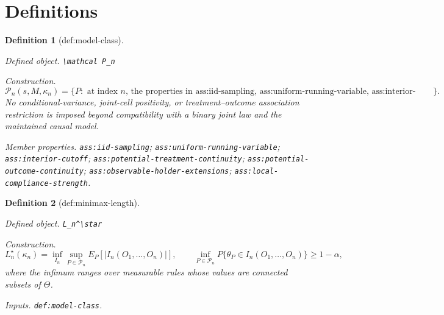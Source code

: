 \documentclass{article}
\newtheorem{definition}{Definition}
\begin{document}
\section{Definitions}

\begin{definition}[def:model-class]\label{def:model-class}
\par\smallskip\noindent\emph{Defined object.} \texttt{\textbackslash{}\allowbreak{}mathcal P\_\allowbreak{}n}
\par\smallskip\noindent\emph{Construction.} \[\mathcal P_n(s,M,\kappa_n)=\{P:\text{ at index }n\text{, the properties in ass:iid-sampling, ass:uniform-running-variable, ass:interior-cutoff, ass:potential-treatment-continuity, ass:potential-outcome-continuity, ass:observable-holder-extensions, and ass:local-compliance-strength hold}\}.\] No conditional-variance, joint-cell positivity, or treatment--outcome association restriction is imposed beyond compatibility with a binary joint law and the maintained causal model.
\par\smallskip\noindent\emph{Member properties.} \texttt{ass:\allowbreak{}iid-\allowbreak{}sampling}; \texttt{ass:\allowbreak{}uniform-\allowbreak{}running-\allowbreak{}variable}; \texttt{ass:\allowbreak{}interior-\allowbreak{}cutoff}; \texttt{ass:\allowbreak{}potential-\allowbreak{}treatment-\allowbreak{}continuity}; \texttt{ass:\allowbreak{}potential-\allowbreak{}outcome-\allowbreak{}continuity}; \texttt{ass:\allowbreak{}observable-\allowbreak{}holder-\allowbreak{}extensions}; \texttt{ass:\allowbreak{}local-\allowbreak{}compliance-\allowbreak{}strength}.
\end{definition}

\begin{definition}[def:minimax-length]\label{def:minimax-length}
\par\smallskip\noindent\emph{Defined object.} \texttt{L\_\allowbreak{}n\textasciicircum{}\textbackslash{}\allowbreak{}star}
\par\smallskip\noindent\emph{Construction.} \[L_n^\star(\kappa_n)=\inf_{I_n}\sup_{P\in\mathcal P_n}E_P[|I_n(O_1,\ldots,O_n)|],\qquad \inf_{P\in\mathcal P_n}P\{\theta_P\in I_n(O_1,\ldots,O_n)\}\ge1-\alpha,\] where the infimum ranges over measurable rules whose values are connected subsets of \(\Theta\).
\par\smallskip\noindent\emph{Inputs.} \texttt{def:\allowbreak{}model-\allowbreak{}class}.
\end{definition}
\end{document}
